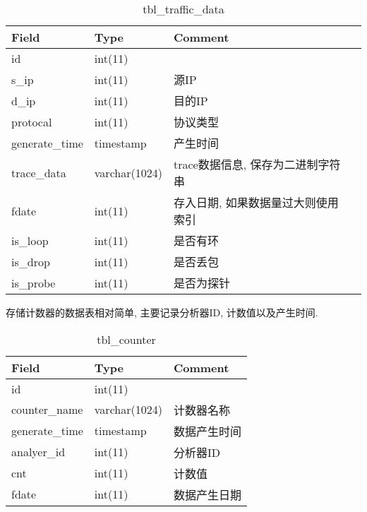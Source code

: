 \begin{table}[]
    \caption{tbl\_traffic\_data}   %
    \begin{tabular}{llll}   \hline
    Field          & Type          & Comment                   \\ \hline
    id             & int(11)       &                           \\
    s\_ip          & int(11)       & 源IP                       \\
    d\_ip          & int(11)       & 目的IP                      \\
    protocal       & int(11)       & 协议类型                      \\
    generate\_time & timestamp     & 产生时间                      \\
    trace\_data    & varchar(1024) & trace数据信息, 保存为二进制字符串    \\
    fdate          & int(11)       & 存入日期, 如果数据量过大则使用索引 \\
    is\_loop       & int(11)       & 是否有环                      \\
    is\_drop       & int(11)       & 是否丢包                      \\
    is\_probe      & int(11)       & 是否为探针                    \\ \hline
    \end{tabular}
    \label{tbl_traffic_data}
\end{table}

存储计数器的数据表相对简单, 主要记录分析器ID, 计数值以及产生时间.

\begin{table}[]
    \caption{tbl\_counter}
    \label{tbl_counter}
    \begin{tabular}{lll} \hline
    Field          & Type          & Comment \\ \hline
    id             & int(11)       &         \\
    counter\_name  & varchar(1024) & 计数器名称   \\
    generate\_time & timestamp     & 数据产生时间  \\
    analyer\_id    & int(11)       & 分析器ID   \\
    cnt            & int(11)       & 计数值     \\
    fdate          & int(11)       & 数据产生日期  \\ \hline
    \end{tabular}
\end{table}

